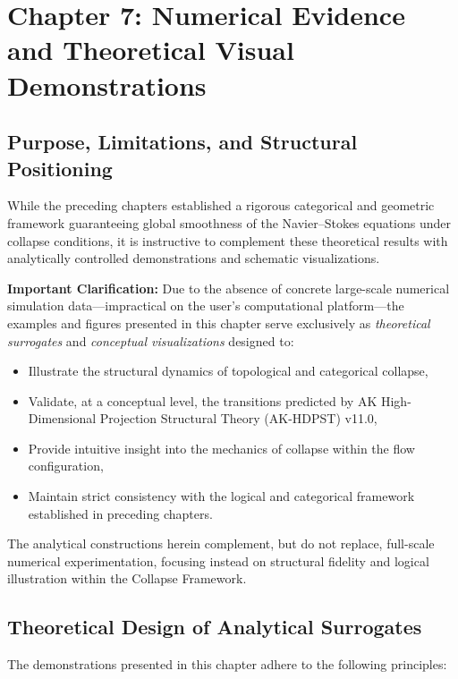 \documentclass[11pt]{article}
\begin{document}
\section{Chapter 7: Numerical Evidence and Theoretical Visual Demonstrations}

\subsection{Purpose, Limitations, and Structural Positioning}

While the preceding chapters established a rigorous categorical and geometric framework guaranteeing global smoothness of the Navier–Stokes equations under collapse conditions, it is instructive to complement these theoretical results with analytically controlled demonstrations and schematic visualizations.

\textbf{Important Clarification:}  
Due to the absence of concrete large-scale numerical simulation data—impractical on the user's computational platform—the examples and figures presented in this chapter serve exclusively as \emph{theoretical surrogates} and \emph{conceptual visualizations} designed to:

\begin{itemize}
  \item Illustrate the structural dynamics of topological and categorical collapse,
  \item Validate, at a conceptual level, the transitions predicted by AK High-Dimensional Projection Structural Theory (AK-HDPST) v11.0,
  \item Provide intuitive insight into the mechanics of collapse within the flow configuration,
  \item Maintain strict consistency with the logical and categorical framework established in preceding chapters.
\end{itemize}

The analytical constructions herein complement, but do not replace, full-scale numerical experimentation, focusing instead on structural fidelity and logical illustration within the Collapse Framework.

\subsection{Theoretical Design of Analytical Surrogates}

The demonstrations presented in this chapter adhere to the following principles:
\end{document}
